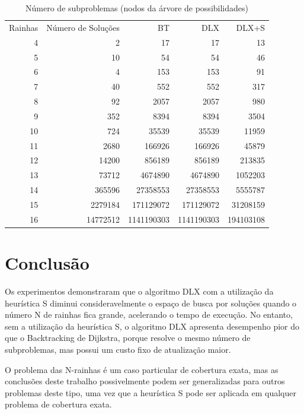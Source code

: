 \documentclass{article}
\begin{document}
\begin{center}
  \begin{table}
  \centering
  \begin{tabular}{ r r r r r }
    Rainhas & Número de Soluções & BT & DLX & DLX+S \\
    4  & 2        & 17         & 17         & 13 \\
    5  & 10       & 54         & 54         & 46 \\
    6  & 4        & 153        & 153        & 91 \\
    7  & 40       & 552        & 552        & 317 \\
    8  & 92       & 2057       & 2057       & 980 \\
    9  & 352      & 8394       & 8394       & 3504 \\
    10 & 724      & 35539      & 35539      & 11959 \\
    11 & 2680     & 166926     & 166926     & 45879 \\
    12 & 14200    & 856189     & 856189     & 213835 \\
    13 & 73712    & 4674890    & 4674890    & 1052203 \\
    14 & 365596   & 27358553   & 27358553   & 5555787 \\
    15 & 2279184  & 171129072  & 171129072  & 31208159 \\
    16 & 14772512 & 1141190303 & 1141190303 & 194103108 \\
  \end{tabular}
  \caption{Número de subproblemas (nodos da árvore de possibilidades)}
  \label{tab:tab_3}
  \end{table}
\end{center}

\section{Conclusão}

Os experimentos demonstraram que o algoritmo DLX com a utilização da heurística S diminui consideravelmente
o espaço de busca por soluções quando o número N de rainhas fica grande, acelerando o tempo de execução.
No entanto, sem a utilização da heurística S, o algoritmo DLX apresenta desempenho pior do que o 
Backtracking de Dijkstra, porque resolve o mesmo número de subproblemas, mas possui um custo fixo de atualização maior.

O problema das N-rainhas é um caso particular de cobertura exata, mas as conclusões deste trabalho possivelmente 
podem ser generalizadas para outros problemas deste tipo, uma vez que a heurística S pode ser aplicada em 
qualquer problema de cobertura exata.

 

\end{document}
